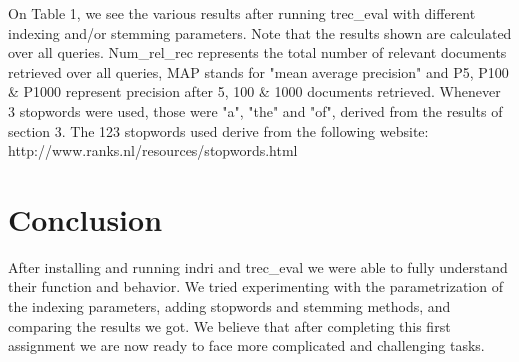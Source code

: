 \documentclass[letterpaper,11pt]{article}
\begin{document}
On Table 1, we see the various results after running trec\_eval with different indexing and/or stemming parameters. Note that the results shown are calculated over all queries. Num\_rel\_rec represents the total number of relevant documents retrieved over all queries, MAP stands for "mean average precision"  and P5, P100 \& P1000 represent precision after 5, 100 \& 1000 documents retrieved. Whenever 3 stopwords were used, those were "a", "the" and "of", derived from the results of section 3. The 123 stopwords used derive from the following website: http://www.ranks.nl/resources/stopwords.html

\section{Conclusion}
After installing and running indri and trec\_eval we were able to fully understand their function and behavior. We tried experimenting with the parametrization of the indexing parameters, adding stopwords and stemming methods, and comparing the results we got. We believe that after completing this first assignment we are now ready to face more complicated and challenging tasks.











    
\end{document}
